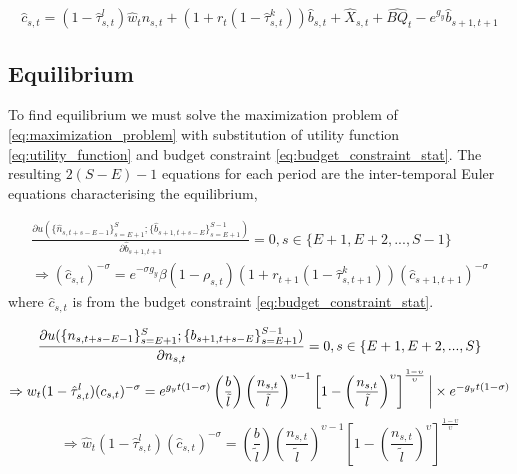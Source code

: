 \begin{equation}\label{eq:budget_constraint_stat}
    \hat{c}_{s,t} = (1-\hat{\tau}^l_{s,t})\hat{w}_t n_{s,t} + (1+r_t(1-\hat{\tau}^k_{s,t}))\hat{b}_{s,t} + \hat{X}_{s,t} + \hat{BQ}_t - e^{g_y}\hat{b}_{s+1, t+1}
\end{equation}


\subsection{Equilibrium}
\label{subsec:equilibrium}

To find equilibrium we must solve the maximization problem of \textcolor{Fuchsia}{\eqref{eq:maximization_problem}} with substitution of utility function \textcolor{Fuchsia}{\eqref{eq:utility_function}} and budget constraint \textcolor{Fuchsia}{\eqref{eq:budget_constraint_stat}}. The resulting $2(S-E)-1$ equations for each period are the inter-temporal Euler equations characterising the equilibrium,

\begin{equation}\label{eq:euler_equations}
    \begin{gathered}
        \frac{\partial u(\{\hat{n}_{s,t+s-E-1}\}^S_{s=E+1};\{\hat{b}_{s+1,t+s-E}\}^{S-1}_{s=E+1})}{\partial \hat{b}_{s+1,t+1}} = 0, s \in \{ E+1, E+2, ..., S-1\}
        \\
        \Rightarrow (\hat{c}_{s,t})^{-\sigma} = e^{-\sigma g_y} \beta (1-\rho_{s,t}) (1+r_{t+1}(1-\hat{\tau}^k_{s,t+1}))(\hat{c}_{s+1,t+1})^{-\sigma}
    \end{gathered}
\end{equation}
where $\hat{c}_{s,t}$ is from the budget constraint \textcolor{Fuchsia}{\eqref{eq:budget_constraint_stat}}.

\begin{equation}\notag
    \begin{gathered}
        \frac{\partial u(\{n_{s,t+s-E-1}\}^S_{s=E+1};\{b_{s+1,t+s-E}\}^{S-1}_{s=E+1})}{\partial n_{s,t}} = 0, s \in \{E+1, E+2, ..., S\}
        \\
        \Rightarrow w_t(1-\hat{\tau}^l_{s,t})(c_{s,t})^{-\sigma}= e^{g_y t (1-\sigma)} \left( \frac{b}{\tilde{l}} \right) \left( \frac{n_{s,t}}{\tilde{l}} \right)^{\upsilon - 1} \left[ 1- \left( \frac{n_{s,t}}{\tilde{l}} \right)^{\upsilon} \right]^{\frac{1-\upsilon}{\upsilon}} \bigg| \times e^{-g_y t (1-\sigma)}
    \end{gathered}
\end{equation}
\begin{equation}\label{eq:euler_solution}
    \Rightarrow \hat{w}_t(1-\hat{\tau}^l_{s,t})(\hat{c}_{s,t})^{-\sigma} = \left( \frac{b}{\tilde{l}} \right) \left( \frac{n_{s,t}}{\tilde{l}} \right)^{\upsilon - 1} \left[ 1- \left( \frac{n_{s,t}}{\tilde{l}} \right)^{\upsilon} \right]^{\frac{1-\upsilon}{\upsilon}}
\end{equation}


